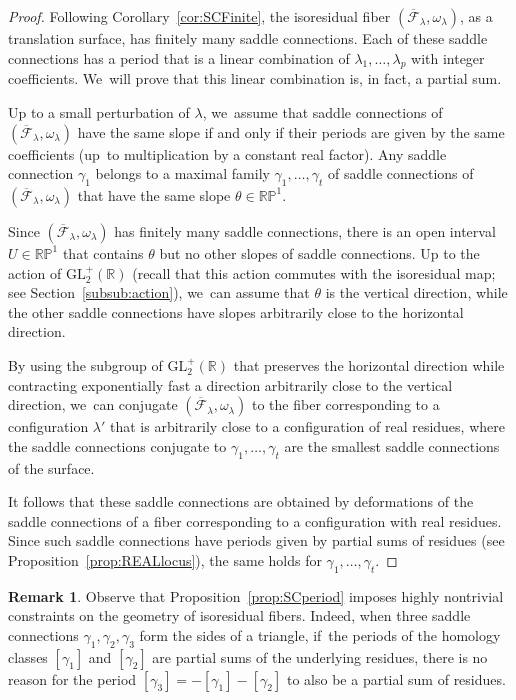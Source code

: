 \documentclass[11pt]{article}
\theoremstyle{definition}
\newtheorem{rmk}[thm]{Remark}
\begin{document}
\begin{proof}
Following Corollary~\ref{cor:SCFinite}, the isoresidual fiber $(\overline{\mathcal{F}}_{\lambda},\omega_{\lambda})$, as a translation surface, has finitely many saddle connections. Each of these saddle connections has a period that is a linear combination of $\lambda_{1},\dots,\lambda_{p}$ with integer coefficients. We~will prove that this linear combination is, in fact, a partial sum.

Up to a small perturbation of $\lambda$, we~assume that saddle connections of $(\overline{\mathcal{F}}_{\lambda},\omega_{\lambda})$ have the same slope if and only if their periods are given by the same coefficients (up~to multiplication by a constant real factor). Any saddle connection $\gamma_{1}$ belongs to a maximal family $\gamma_{1},\dots,\gamma_{t}$ of saddle connections of $(\overline{\mathcal{F}}_{\lambda},\omega_{\lambda})$ that have the same slope $\theta \in \mathbb{RP}^{1}$.

Since $(\overline{\mathcal{F}}_{\lambda},\omega_{\lambda})$ has finitely many saddle connections, there is an open interval $U \in \mathbb{RP}^{1}$ that contains $\theta$ but no other slopes of saddle connections. Up to the action of $\mathrm{GL}_{2}^{+}(\mathbb{R})$ (recall that this action commutes with the isoresidual map; see Section~\ref{subsub:action}), we~can assume that $\theta$ is the vertical direction, while the other saddle connections have slopes arbitrarily close to the horizontal direction.

By using the subgroup of $\mathrm{GL}_{2}^{+}(\mathbb{R})$ that preserves the horizontal direction while contracting exponentially fast a direction arbitrarily close to the vertical direction, we~can conjugate $(\overline{\mathcal{F}}_{\lambda},\omega_{\lambda})$ to the fiber corresponding to a configuration $\lambda'$ that is arbitrarily close to a configuration of real residues, where the saddle connections conjugate to $\gamma_{1},\dots,\gamma_{t}$ are the smallest saddle connections of the surface.

It follows that these saddle connections are obtained by deformations of the saddle connections of a fiber corresponding to a configuration with real residues. Since such saddle connections have periods given by partial sums of residues (see Proposition~\ref{prop:REALlocus}), the same holds for $\gamma_{1},\dots,\gamma_{t}$.
\end{proof}

\begin{rmk}
Observe that Proposition~\ref{prop:SCperiod} imposes highly nontrivial constraints on the geometry of isoresidual fibers. Indeed, when three saddle connections $\gamma_{1},\gamma_{2},\gamma_{3}$ form the sides of a triangle, if~the periods of the homology classes $[\gamma_{1}]$ and $[\gamma_{2}]$ are partial sums of the underlying residues, there is no reason for the period $[\gamma_{3}]=-[\gamma_{1}]-[\gamma_{2}]$ to also be a partial sum of residues.
\end{rmk}
\end{document}
